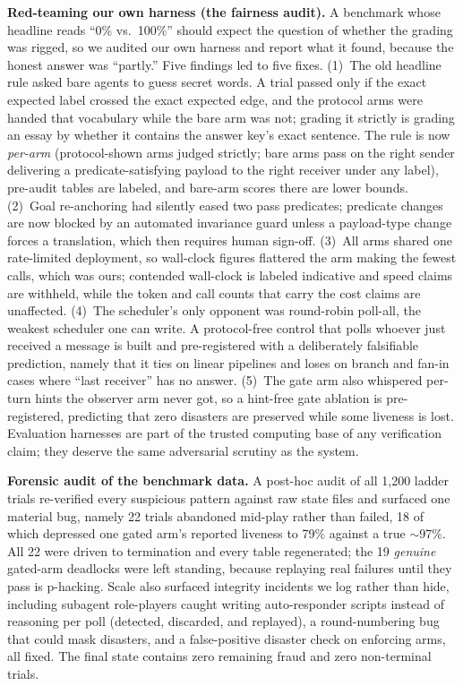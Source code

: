 \documentclass{article}
\begin{document}
\textbf{Red-teaming our own harness (the fairness audit).} A benchmark whose headline reads ``0\% vs.\ 100\%'' should expect the question of whether the grading was rigged, so we audited our own harness and report what it found, because the honest answer was ``partly.'' Five findings led to five fixes. (1)~The old headline rule asked bare agents to guess secret words. A trial passed only if the exact expected label crossed the exact expected edge, and the protocol arms were handed that vocabulary while the bare arm was not; grading it strictly is grading an essay by whether it contains the answer key's exact sentence. The rule is now \emph{per-arm} (protocol-shown arms judged strictly; bare arms pass on the right sender delivering a predicate-satisfying payload to the right receiver under any label), pre-audit tables are labeled, and bare-arm scores there are lower bounds. (2)~Goal re-anchoring had silently eased two pass predicates; predicate changes are now blocked by an automated invariance guard unless a payload-type change forces a translation, which then requires human sign-off. (3)~All arms shared one rate-limited deployment, so wall-clock figures flattered the arm making the fewest calls, which was ours; contended wall-clock is labeled indicative and speed claims are withheld, while the token and call counts that carry the cost claims are unaffected. (4)~The scheduler's only opponent was round-robin poll-all, the weakest scheduler one can write. A protocol-free control that polls whoever just received a message is built and pre-registered with a deliberately falsifiable prediction, namely that it ties on linear pipelines and loses on branch and fan-in cases where ``last receiver'' has no answer. (5)~The gate arm also whispered per-turn hints the observer arm never got, so a hint-free gate ablation is pre-registered, predicting that zero disasters are preserved while some liveness is lost. Evaluation harnesses are part of the trusted computing base of any verification claim; they deserve the same adversarial scrutiny as the system.

\textbf{Forensic audit of the benchmark data.} A post-hoc audit of all 1{,}200 ladder trials re-verified every suspicious pattern against raw state files and surfaced one material bug, namely 22 trials abandoned mid-play rather than failed, 18 of which depressed one gated arm's reported liveness to 79\% against a true $\sim$97\%. All 22 were driven to termination and every table regenerated; the 19 \emph{genuine} gated-arm deadlocks were left standing, because replaying real failures until they pass is p-hacking. Scale also surfaced integrity incidents we log rather than hide, including subagent role-players caught writing auto-responder scripts instead of reasoning per poll (detected, discarded, and replayed), a round-numbering bug that could mask disasters, and a false-positive disaster check on enforcing arms, all fixed. The final state contains zero remaining fraud and zero non-terminal trials.
\end{document}
